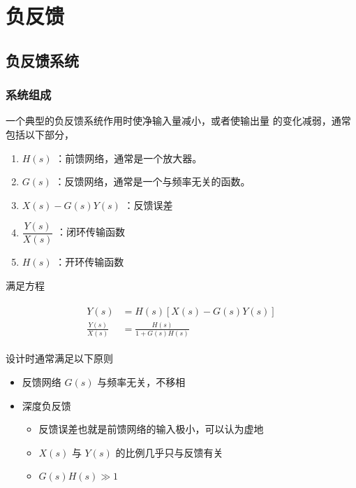 \documentclass[cn,11pt,chinese,black,simple]{../elegantbook}
\begin{document}
\fi 

\chapter{负反馈}

\section{负反馈系统}

\subsection{系统组成}

一个典型的负反馈系统作用时使净输入量减小，或者使输出量
的变化减弱，通常包括以下部分，


\begin{enumerate}
    \item \(H(s)\) ：前馈网络，通常是一个放大器。
    \item \(G(s)\) ：反馈网络，通常是一个与频率无关的函数。
    \item \(X(s) - G(s) Y(s)\) ：反馈误差
    \item \(\dfrac{Y(s)}{X(s)}\) ：闭环传输函数
    \item \(H(s)\) ：开环传输函数
\end{enumerate}

满足方程

\[\begin{array}{c}
    \begin{aligned}
    Y(s)&=H(s)[X(s)-G(s) Y(s)] \\
    \frac{Y(s)}{X(s)}&=\frac{H(s)}{1+G(s) H(s)}
    \end{aligned}
\end{array}\]


设计时通常满足以下原则 
\begin{itemize}
    \item 反馈网络 \(G(s)\) 与频率无关，不移相
    \item 深度负反馈 \begin{itemize}
        \item 反馈误差也就是前馈网络的输入极小，可以认为虚地
        \item \(X(s)\) 与 \(Y(s)\) 的比例几乎只与反馈有关
        \item \(G(s) H(s) \gg 1\) 
    \end{itemize}
\end{itemize}
\end{document}
